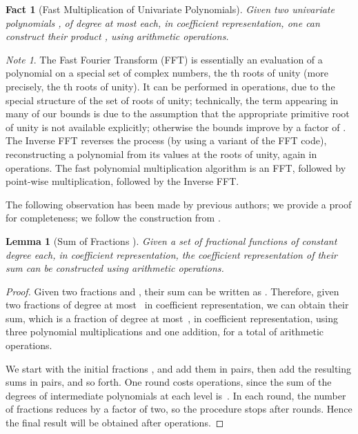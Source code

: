 \documentclass[11pt]{article}
\newtheorem{lemma}[theorem]{Lemma}
\newtheorem{fact}[theorem]{Fact}
\theoremstyle{remark}
\newtheorem*{note}{Note}
\begin{document}
\begin{fact}[Fast Multiplication of Univariate Polynomials]
  \label{fact:fast-multiply}
  Given two univariate polynomials ,  of degree at most 
  each, in coefficient representation, one can construct their product
  , using  arithmetic operations.
\end{fact}

\begin{note}
  The Fast Fourier Transform (FFT) is essentially an evaluation of a
  polynomial on a special set of complex numbers, the th roots of
  unity (more precisely, the th roots of
  unity).  It can be performed in 
  operations, due to the special structure of the set of roots of
  unity; technically, the  term appearing in many of our
  bounds is due to the assumption that the appropriate primitive root
  of unity is not available explicitly; otherwise the bounds improve
  by a factor of .  The Inverse FFT reverses the process
  (by using a variant of the FFT code), reconstructing a polynomial
  from its values at the roots of unity, again in  operations. The fast polynomial multiplication algorithm is an FFT,
  followed by point-wise multiplication, followed by the Inverse FFT.
\end{note}

The following observation has been made by previous authors; we provide a
proof for completeness; we follow the construction from
\cite{ma-cdplbf-12,ma-cdplbf-16}. 


\begin{lemma}[Sum of Fractions \cite{ma-cdplbf-12,ma-cdplbf-16}]
  \label{lemma:sum-fractions}
  Given a set of  fractional functions  of constant
  degree each, in coefficient representation, the coefficient
  representation of their sum can be constructed using  arithmetic operations.
\end{lemma}

\begin{proof}
  Given two fractions  and , their sum can be
  written as .  Therefore, given two fractions of
  degree at most~ in coefficient representation, we can obtain their sum,
  which is a fraction of degree at most~, in coefficient
  representation, using three polynomial multiplications and one
  addition, for a total of  arithmetic
  operations.


  We start with the initial fractions ,  and add
  them in pairs, then add the resulting sums in pairs, and so forth.
  One round costs  operations, since the sum
  of the degrees of intermediate polynomials at each level is~.
  In each round, the number of fractions reduces by a factor of two,
  so the procedure stops after  rounds.  Hence the final
  result will be obtained after 
  operations.
\end{proof}
\end{document}
